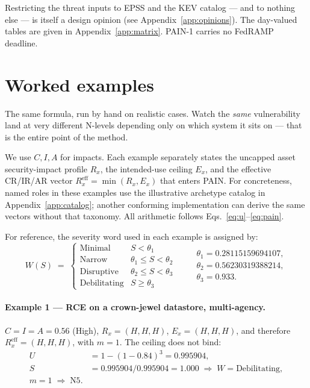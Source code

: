 \documentclass[11pt]{article}
\begin{document}
Restricting the threat inputs to EPSS and the KEV catalog --- and to nothing else ---
is itself a design opinion (see Appendix~\ref{app:opinions}). The day-valued tables
are given in Appendix~\ref{app:matrix}. PAIN-1 carries no FedRAMP deadline.

\section{Worked examples}
\begin{plain}
The same formula, run by hand on realistic cases. Watch the \emph{same}
vulnerability land at very different N-levels depending only on which system it sits
on --- that is the entire point of the method.
\end{plain}
We use $C,I,A$ for impacts. Each example separately states the uncapped asset
security-impact profile $R_x$, the intended-use ceiling $E_x$, and the effective
CR/IR/AR vector $R_x^{\mathrm{eff}}=\min(R_x,E_x)$ that enters PAIN. For
concreteness, named roles in these examples use the illustrative archetype catalog
in Appendix~\ref{app:catalog}; another conforming implementation can derive the
same vectors without that taxonomy. All arithmetic follows
Eqs.~\eqref{eq:u}--\eqref{eq:pain}.

For reference, the severity word used in each example is assigned by:
\[
W(S) \;=\;
\begin{cases}
\text{Minimal} & S < \theta_1 \\
\text{Narrow} & \theta_1 \le S < \theta_2 \\
\text{Disruptive} & \theta_2 \le S < \theta_3 \\
\text{Debilitating} & S \ge \theta_3
\end{cases}
\qquad
\begin{gathered}
\theta_1=0.28115159694107,\\
\theta_2=0.56230319388214,\\
\theta_3=0.933.
\end{gathered}
\]

\paragraph{Example 1 --- RCE on a crown-jewel datastore, multi-agency.}
$C\!=\!I\!=\!A\!=\!0.56$ (High), $R_x=(H,H,H)$,
$E_x=(H,H,H)$, and therefore
$R_x^{\mathrm{eff}}=(H,H,H)$, with $m=1$. The ceiling does not bind:
\begin{align*}
U &= 1-(1-0.84)^3 = 0.995904, \\
S &= 0.995904/0.995904 = 1.000 \;\Rightarrow\; W=\text{Debilitating}, \\
m=1 \;\Rightarrow\; \boxed{\text{N5}}.
\end{align*}
\end{document}
